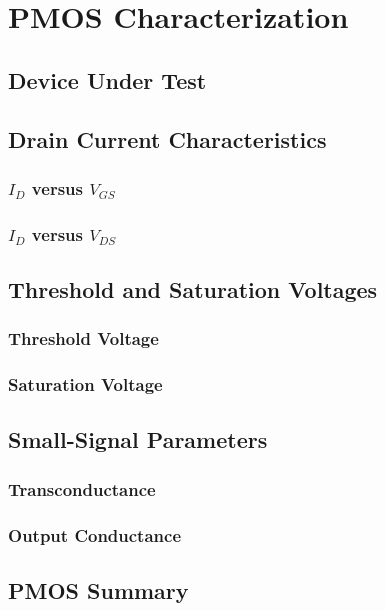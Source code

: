
\section{PMOS Characterization}
\label{sec:pmos_characterization}

\subsection{Device Under Test}



\subsection{Drain Current Characteristics}

\subsubsection{$I_D$ versus $V_{GS}$}



\subsubsection{$I_D$ versus $V_{DS}$}



\subsection{Threshold and Saturation Voltages}

\subsubsection{Threshold Voltage}



\subsubsection{Saturation Voltage}



\subsection{Small-Signal Parameters}

\subsubsection{Transconductance}



\subsubsection{Output Conductance}



\subsection{PMOS Summary}


